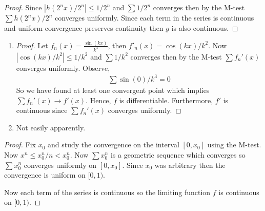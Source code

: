 \begin{proof}
    Since $|h(2^n x)/2^n|\leq 1/2^n$ and $\sum  1/2^n$
    converges then by the M-test $\sum h(2^n x)/2^n$ converges 
    uniformly. Since each term in the series is continuous and 
    uniform convergence preserves continuity then $g$ is also 
    continuous.
\end{proof}

\begin{enumerate}[label=(\alph*)]
    \item 
    \begin{proof}
        Let $f_n(x) = \frac{\sin(kx)}{k^3}$, then $f'_n(x) = \cos(kx)/k^2$.
        Now $|\cos(kx)/k^2|\leq 1/k^2$ and $\sum  1/k^2$
        converges then by the M-test $\sum f_n'(x)$ converges 
        uniformly. Observe,
        \begin{align*}
            \sum \sin(0)/k^3 = 0
        \end{align*}
        So we have found at least one convergent point which implies
        $\sum f_n'(x) \rightarrow f'(x)$. Hence, $f$ is differentiable.
        Furthermore, $f'$ is continuous since $\sum f_n'(x)$ converges 
        uniformly.
    \end{proof}

    \item
    Not easily apparently.
\end{enumerate}

\begin{proof}
    Fix $x_0$ and study the convergence 
    on the interval $[0,x_0]$ using the M-test.
    Now $x^n \leq x_0^n/n<x_0^n$.
    Now $\sum x_0^n$ is a geometric sequence which 
    converges so $\sum x_0^n$ converges 
    uniformly on $[0,x_0]$. Since $x_0$ was arbitrary then
    the convergence is uniform on $[0,1)$.

    Now each term of the series is continuous so 
    the limiting function $f$ is continuous on $[0,1)$.
\end{proof}

